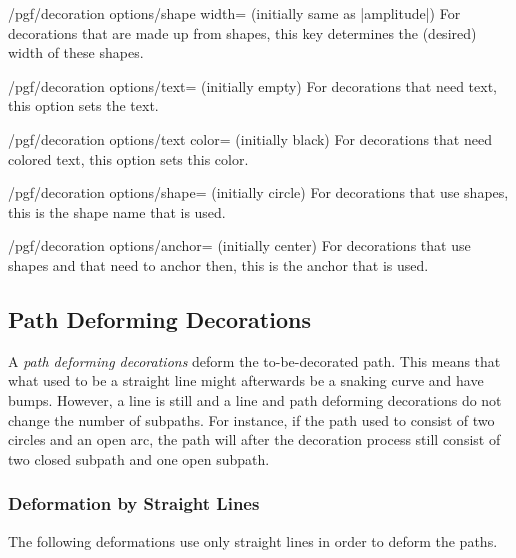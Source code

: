 \begin{key}{/pgf/decoration options/shape width=
    (initially \normalfont same as |amplitude|)}
  For decorations that are made up from shapes, this key determines
  the (desired) width of these shapes.
\end{key}

\begin{key}{/pgf/decoration options/text=
    (initially \normalfont empty)}
  For decorations that need text, this option sets the text.
\end{key}

\begin{key}{/pgf/decoration options/text color=
    (initially \normalfont black)}
  For decorations that need colored text, this option sets this color.
\end{key}

\begin{key}{/pgf/decoration options/shape= (initially circle)}
  For decorations that use shapes, this is the shape name that is used.
\end{key}

\begin{key}{/pgf/decoration options/anchor=    (initially center)}
  For decorations that use shapes and that need to anchor then, this
  is the anchor that is used.
\end{key}



\subsection{Path Deforming Decorations}

A \emph{path deforming decorations} deform the to-be-decorated
path. This means that what used to be a straight line might afterwards
be a snaking curve and have bumps. However, a line is still and a line
and path deforming decorations do not change the number of
subpaths. For instance, if the path used to consist of two circles and
an open arc, the path will after the decoration process still consist
of two closed subpath and one open subpath.


\subsubsection{Deformation by Straight Lines}

The following deformations use only straight lines in order to deform
the paths.


